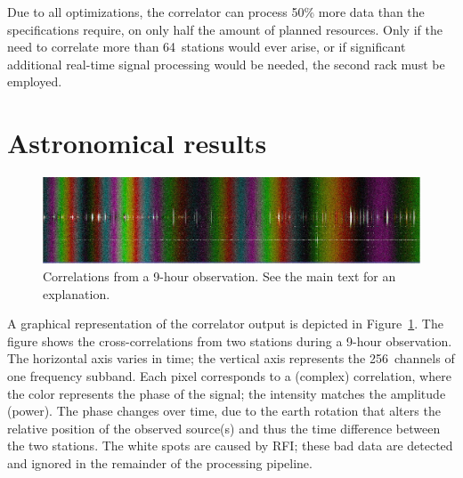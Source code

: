 \documentclass{sig-alternate}
\begin{document}

Due to all optimizations, the correlator can process 50\% more data than
the specifications require, on only half the amount of planned resources.
Only if the need to correlate more than 64~stations would ever arise, or if
significant additional real-time signal processing would be needed, the
second rack must be employed.


\section{Astronomical results}

\begin{figure}[ht]
\includegraphics[width=\columnwidth]{fringe.jpg}
\caption{Correlations from a 9-hour observation.  See the main text for
an explanation.}
\label{fig:fringe}
\end{figure}

A graphical representation of the correlator output is depicted in
Figure~\ref{fig:fringe}.
The figure shows the cross-correlations from two stations during a 9-hour
observation.
The horizontal axis varies in time;
the vertical axis represents the 256~channels of one frequency subband.
Each pixel corresponds to a (complex) correlation, where the color represents
the phase of the signal; the intensity matches the amplitude (power).
The phase changes over time, due to the earth rotation that alters the
relative position of the observed source(s) and thus the time difference
between the two stations.
The white spots are caused by RFI; these bad data are detected and
ignored in the remainder of the processing pipeline.
\end{document}

